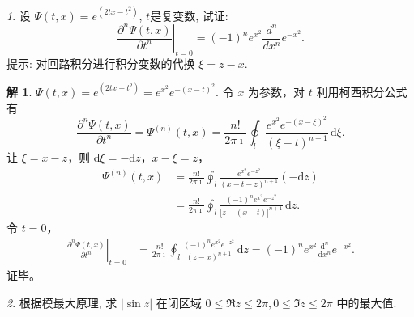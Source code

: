 \documentclass[11pt]{article}
\theoremstyle{remark}
\newtheorem{problem}{}
\theoremstyle{definition}
\newtheorem{solution}{解}
\begin{document}
\renewcommand{\labelenumi}{(\arabic{enumi})}
\renewcommand{\labelenumii}{(\arabic{enumi}.\arabic{enumii})}

\begin{problem}
设 $\Psi(t, x)=e^{ \left(2 t x-t^2\right)}$, $t$是复变数, 试证:
\[
\left.\frac{\partial^n \Psi(t, x)}{\partial t^n}\right|_{t=0}=(-1)^n e^{x^2} \frac{d^n}{d x^n} e^{-x^2}.
\]
提示: 对回路积分进行积分变数的代换 $\xi=z-x$.
\end{problem}

\begin{solution}
$\Psi(t,x)=e^{(2tx-t^{2})}=e^{x^{2}}e^{-(x-t)^{2}}$.
令 $x$ 为参数，对 $t$ 利用柯西积分公式有
\[
\frac{\partial^{n}\Psi(t,x)}{\partial t^{n}}
=\Psi^{(n)}(t,x)
=\frac{n!}{2\pi\imath}\oint_{l}
\frac{e^{x^{2}}e^{-(x-\xi)^{2}}}{(\xi-t)^{n+1}}\,\mathrm{d}\xi.
\]
让 $\xi=x-z$，则 $\mathrm{d}\xi=-\mathrm{d}z$，$x-\xi=z$，
\begin{align*}
\Psi^{(n)}(t,x)
&=\frac{n!}{2\pi\imath}\oint_{l}
\frac{e^{x^{2}}e^{-z^{2}}}{(x-t-z)^{n+1}}(-\mathrm{d}z) \\
&=\frac{n!}{2\pi\imath}\oint_{l}
\frac{(-1)^{n}e^{x^{2}}e^{-z^{2}}}{\bigl[z-(x-t)\bigr]^{n+1}}\,\mathrm{d}z.
\end{align*}
令 $t=0$，
\begin{align*}
\left.\frac{\partial^{n}\Psi(t,x)}{\partial t^{n}}\right|_{t=0}
&=\frac{n!}{2\pi\imath}\oint_{l}
\frac{(-1)^{n}e^{x^{2}}e^{-z^{2}}}{(z-x)^{n+1}}\,\mathrm{d}z
=(-1)^{n}e^{x^{2}}\frac{\mathrm{d}^{n}}{\mathrm{d}x^{n}}e^{-x^{2}}.
\end{align*}
证毕。
\end{solution}

\begin{problem}
根据模最大原理,
求 $|\sin z|$ 在闭区域 $0 \leq \Re z \leq 2 \pi, 0 \leq \Im z \leq 2 \pi$ 中的最大值.
\end{problem}
\end{document}
